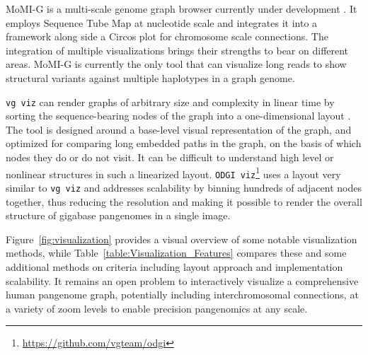MoMI-G is a multi-scale genome graph browser currently under development \cite{yokoyama_momi-g:_2019}. 
It employs Sequence Tube Map at nucleotide scale and integrates it into a framework along side a Circos \cite{Krzywinski_2009_Circos} plot for chromosome scale connections. 
The integration of multiple visualizations brings their strengths to bear on different areas. 
MoMI-G is currently the only tool that can visualize long reads to show structural variants against multiple haplotypes in a graph genome.

\texttt{vg viz} can render graphs of arbitrary size and complexity in linear time by sorting the sequence-bearing nodes of the graph into a one-dimensional layout \citep{Garrison_2019}. 
The tool is designed around a base-level visual representation of the graph, and optimized for comparing long embedded paths in the graph, on the basis of which nodes they do or do not visit. 
It can be difficult to understand high level or nonlinear structures in such a linearized layout. 
\texttt{ODGI viz}\footnote{\url{https://github.com/vgteam/odgi}} uses a layout very similar to \texttt{vg viz} and addresses scalability by binning hundreds of adjacent nodes together, thus reducing the resolution and making it possible to render the overall structure of gigabase pangenomes in a single image.

Figure~\ref{fig:visualization} provides a visual overview of some notable visualization methods, while Table~\ref{table:Visualization_Features} compares these and some additional methods on criteria including layout approach and implementation scalability.
It remains an open problem to interactively visualize a comprehensive human pangenome graph, potentially including interchromosomal connections, at a variety of zoom levels to enable precision pangenomics at any scale.

